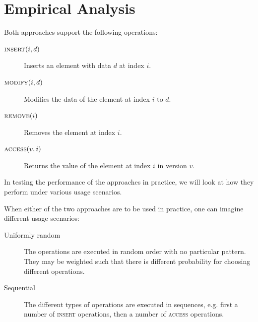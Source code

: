 \chapter{Empirical Analysis}

Both approaches support the following operations:

\begin{description}

  \item[$\textsc{insert}(i,d)$] Inserts an element with data $d$ at index $i$.

  \item[$\textsc{modify}(i,d)$] Modifies the data of the element at index $i$ to
  $d$.

  \item[$\textsc{remove}(i)$] Removes the element at index $i$.

  \item[$\textsc{access}(v,i)$] Returns the value of the element at index $i$ in
  version $v$.

% 
% 

\end{description}

In testing the performance of the approaches in practice, we will look at how
they perform under various usage scenarios.

When either of the two approaches are to be used in practice, one can imagine
different usage scenarios:

\begin{description}

  \item[Uniformly random] The operations are executed in random order with no
  particular pattern. They may be weighted such that there is different
  probability for choosing different operations.

  \item[Sequential] The different types of operations are executed in sequences,
  e.g. first a number of \textsc{insert} operations, then a number of
  \textsc{access} operations. 

\end{description}

